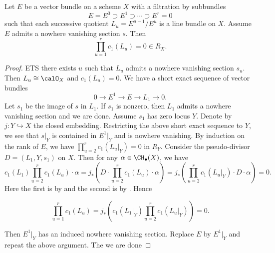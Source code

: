   \begin{lemma}\label{lem:nowhere_vanishing_section_implies_vanishing_product_of_chern_classes}
    Let $E$ be a vector bundle on a scheme $X$ with a filtration by subbundles
    \[ E = E^0 \supset E^1 \supset \cdots \supset E^r = 0 \]
    such that each successive quotient $L_u = E^{u-1} / E^u$ is a line bundle on $X$.
    Assume $E$ admits a nowhere vanishing section $s$.
    Then 
    \[ \prod_{u=1}^r c_1(L_u) = 0 \in R_X. \]
  \end{lemma}
  \begin{proof}
    ETS there exists $u$ such that $L_u$ admits a nowhere vanishing section $s_u$.
    Then $L_u \cong \calO_X$ and $c_1(L_u) = 0$.
    We have a short exact sequence of vector bundles 
    \[ 0 \to E^1 \to E \to L_1 \to 0. \]
    Let $s_1$ be the image of $s$ in $L_1$.
    If $s_1$ is nonzero, then $L_1$ admits a nowhere vanishing section and we are done.
    Assume $s_1$ has zero locus $Y$.
    Denote by $j: Y \hookrightarrow X$ the closed embedding.
    Restricting the above short exact sequence to $Y$, we see that $s|_Y$ is contained in $E^1|_Y$ and is nowhere vanishing.
    By induction on the rank of $E$, we have $\prod_{u=2}^r c_1(L_u|_Y) = 0$ in $R_Y$.
    Consider the pseudo-divisor $D = (L_1, Y, s_1)$ on $X$.
    Then for any $\alpha \in \CH_\bullet(X)$, we have \Yang{}
    \[ c_1(L_1) \prod_{u=2}^r c_1(L_u) \cdot \alpha = j_* \left( D \cdot \prod_{u=2}^r c_1(L_u) \cdot \alpha \right) = j_* \left(\prod_{u=2}^r c_1(L_u|_Y) \cdot D \cdot \alpha \right) = 0. \]
    Here the first is by \Yang{} and the second is by \Yang{}.
    Hence

    \[ \prod_{u=1}^r c_1(L_u) = j_* \left( c_1(L_1|_Y) \prod_{u=2}^r c_1(L_u|_Y) \right) = 0. \]


    Then $E^1|_Y$  has an induced nowhere vanishing section.
    Replace $E$ by $E^1|_Y$ and repeat the above argument.
    The we are done
    \Yang{}
  \end{proof}

